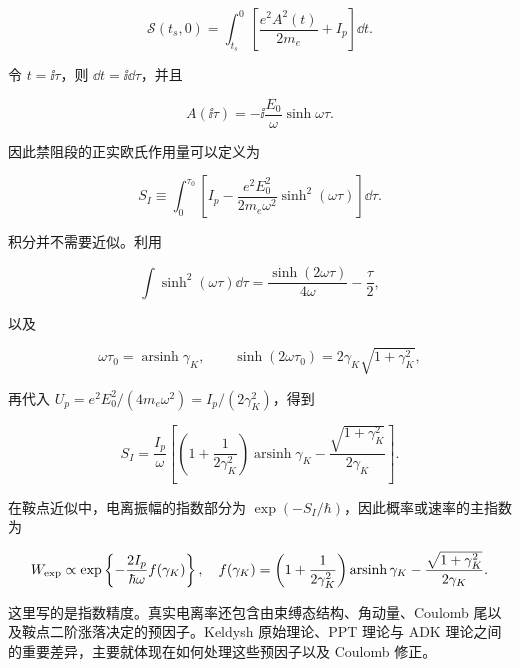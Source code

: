 \[
\mathcal S(t_s,0)
=\int_{t_s}^{0}
\left[
\frac{e^2A^2(t)}{2m_e}+I_p
\right]\dd t.
\]

令 \(t=\ii\tau\)，则 \(\dd t=\ii\dd\tau\)，并且

\[
A(\ii\tau)
=-\ii\frac{E_0}{\omega}\sinh\omega\tau.
\]

因此禁阻段的正实欧氏作用量可以定义为

\begin{equation}
S_I
\equiv
\int_{0}^{\tau_0}
\left[
I_p-
\frac{e^2E_0^2}{2m_e\omega^2}
\sinh^2(\omega\tau)
\right]\dd\tau.
\label{eq:keldysh-euclidean-action}
\end{equation}

积分并不需要近似。利用

\[
\int\sinh^2(\omega\tau)\dd\tau
=
\frac{\sinh(2\omega\tau)}{4\omega}-\frac{\tau}{2},
\]

以及

\[
\omega\tau_0=\operatorname{arsinh}\gamma_K,
\qquad
\sinh(2\omega\tau_0)
=2\gamma_K\sqrt{1+\gamma_K^2},
\]

再代入 \(U_p=e^2E_0^2/(4m_e\omega^2)=I_p/(2\gamma_K^2)\)，得到

\begin{equation}
S_I
=
\frac{I_p}{\omega}
\left[
\left(1+\frac{1}{2\gamma_K^2}\right)
\operatorname{arsinh}\gamma_K
-
\frac{\sqrt{1+\gamma_K^2}}{2\gamma_K}
\right].
\label{eq:keldysh-action-finite-gamma}
\end{equation}

在鞍点近似中，电离振幅的指数部分为 \(\exp(-S_I/\hbar)\)，因此概率或速率的主指数为

\begin{equation}
W_{\rm exp}
\propto
\exp\left\{
-\frac{2I_p}{\hbar\omega}
 f(\gamma_K)
\right\},
\quad
f(\gamma_K)
=
\left(1+\frac{1}{2\gamma_K^2}\right)
\operatorname{arsinh}\gamma_K
-
\frac{\sqrt{1+\gamma_K^2}}{2\gamma_K}.
\label{eq:keldysh-exponent}
\end{equation}

这里写的是指数精度。真实电离率还包含由束缚态结构、角动量、Coulomb 尾以及鞍点二阶涨落决定的预因子。Keldysh 原始理论、PPT 理论与 ADK 理论之间的重要差异，主要就体现在如何处理这些预因子以及 Coulomb 修正。


